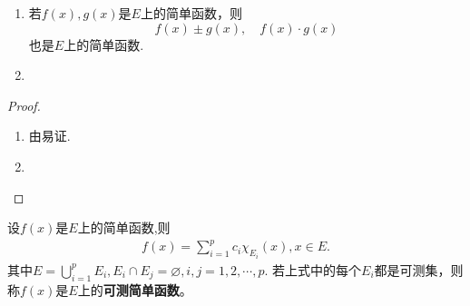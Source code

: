 \documentclass[../../main.tex]{subfiles}%
\begin{document}
\begin{proposition}\label{proposition:简单函数的性质}
\begin{enumerate}
\item 若$f(x),g(x)$是$E$上的简单函数，则$$f(x) \pm g(x),\quad f(x) \cdot g(x)$$
也是$E$上的简单函数.

\item 
\end{enumerate}
\end{proposition}
\begin{proof}
\begin{enumerate}
\item 由易证.

\item 
\end{enumerate}

\end{proof}

\begin{definition}[可测简单函数]
设$f(x)$是$E$上的简单函数,则
\begin{align*}
f(x)= \sum_{i = 1}^{p} c_i \chi_{E_i}(x),x \in E.
\end{align*}
其中$E = \bigcup_{i = 1}^{p} E_i,  E_i \cap E_j = \varnothing, i, j = 1, 2, \cdots, p.$
若上式中的每个$E_i$都是可测集，则称$f(x)$是$E$上的\textbf{可测简单函数}。
\end{definition}
\end{document}
